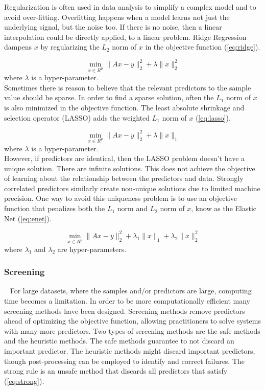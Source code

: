 \documentclass{article}
\begin{document}
\quad Regularization is often used in data analysis to simplify a complex model and to avoid over-fitting. Overfitting happens when a model learns not just the underlying signal, but the noise too. If there is no noise, then a linear interpolation could be directly applied, to a linear problem. Ridge Regression dampens $x$ by regularizing the $L_2$ norm of $x$ in the objective function (\ref{eq:ridge}). 

\begin{equation} \label{eq:ridge}
\min_{x\in R^p} \|Ax-y\|_2^2 + \lambda \|x\|_2^2
\end{equation}
where $\lambda$ is a hyper-parameter.\\

\quad Sometimes there is reason to believe that the relevant predictors to the sample value should be sparse. In order to find a sparse solution, often the $L_1$ norm of $x$ is also minimized in the objective function. The least absolute shrinkage and selection operator (LASSO) adds the weighted $L_1$ norm of $x$ (\ref{eq:lasso}). 

\begin{equation} \label{eq:lasso}
\min_{x\in R^p} \|Ax-y\|_2^2 + \lambda \|x\|_1
\end{equation}
where $\lambda$ is a hyper-parameter.\\

However, if predictors are identical, then the LASSO problem doesn't have a unique solution. There are infinite solutions. This does not achieve the objective of learning about the relationship between the predictors and data. Strongly correlated predictors similarly create non-unique solutions due to limited machine precision. One way to avoid this uniqueness problem is to use an objective function that penalizes both the $L_1$ norm and $L_2$ norm of $x$, know as the Elastic Net (\ref{eq:enet}).

\begin{equation} \label{eq:enet}
\min_{x\in R^p} \|Ax-y\|_2^2 + \lambda_1 \|x\|_1 + \lambda_2 \|x\|_2^2
\end{equation}
where $\lambda_1$ and $\lambda_2$ are hyper-parameters.\\

\subsubsection*{Screening}
\qquad ~ For large datasets, where the samples and/or predictors are large, computing time becomes a limitation. In order to be more computationally efficient many screening methods have been designed. Screening methods remove predictors ahead of optimizing the objective function, allowing practitioners to solve systems with many more predictors. Two types of screening methods are the safe methods and the heuristic methods. The safe methods guarantee to not discard an important predictor. The heuristic methods might discard important predictors, though post-processing can be employed to identify and correct failures. The strong rule \cite{strong} is an unsafe method that discards all predictors that satisfy (\ref{eq:strong}). 
\end{document}

